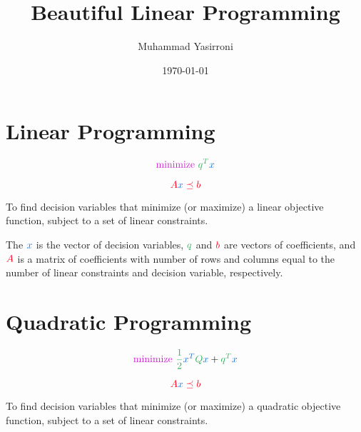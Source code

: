 \documentclass{article}
\title{Beautiful Linear Programming}
\author{Muhammad Yasirroni}
\date{\today}
\begin{document}
\maketitle

\section{Linear Programming}

\begin{equation}
    \textcolor{opt}{\text{minimize~}}
    \color{obj} q^T
    \color{var} x
    \color{eq}
\end{equation}

\begin{equation}
    \color{const} A
    \color{var} x
    \color{const} \preceq b
    \color{eq}
\end{equation}

To find \textcolor{var}{decision variables} that \textcolor{opt}{minimize} (or \textcolor{opt}{maximize}) a \textcolor{obj}{linear objective function}, subject to a set of \textcolor{const}{linear constraints}.

The $\color{var} x$ is the vector of decision variables, $\color{obj} q$ and $\color{const} b$ are vectors of coefficients, and $\color{const} A$ is a matrix of coefficients with number of rows and columns equal to the number of \textcolor{const}{linear constraints} and \textcolor{var}{decision variable}, respectively.

\section{Quadratic Programming}

\begin{equation}
    \textcolor{opt}{\text{minimize~}}
    \color{obj} \frac{1}{2} 
    \color{var} x^T
    \color{obj} Q
    \color{var} x
    \color{eq} + 
    \color{obj} q^T
    \color{var} x
    \color{eq}
\end{equation}

\begin{equation}
    \color{const} A
    \color{var} x
    \color{const} \preceq b
    \color{eq}
\end{equation}

To find \textcolor{var}{decision variables} that \textcolor{opt}{minimize} (or \textcolor{opt}{maximize}) a \textcolor{obj}{quadratic objective function}, subject to a set of \textcolor{const}{linear constraints}.
\end{document}

